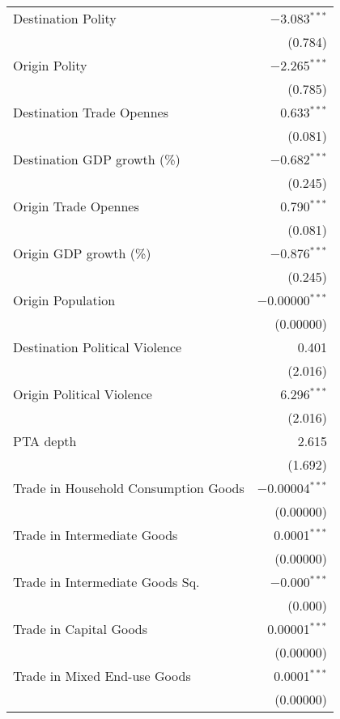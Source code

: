 \documentclass{article}
\begin{document}
\begin{longtable}{lr}
 Destination Polity & $-$3.083$^{***}$ \\ 
  & (0.784) \\ 

 Origin Polity & $-$2.265$^{***}$ \\ 
  & (0.785) \\ 

 Destination Trade Opennes & 0.633$^{***}$ \\ 
  & (0.081) \\ 

 Destination GDP growth (\%) & $-$0.682$^{***}$ \\ 
  & (0.245) \\ 

 Origin Trade Opennes & 0.790$^{***}$ \\ 
  & (0.081) \\ 

 Origin GDP growth (\%) & $-$0.876$^{***}$ \\ 
  & (0.245) \\ 

 Origin Population & $-$0.00000$^{***}$ \\ 
  & (0.00000) \\ 

 Destination Political Violence & 0.401 \\ 
  & (2.016) \\ 
 
Origin Political Violence & 6.296$^{***}$ \\ 
  & (2.016) \\ 

PTA depth & 2.615 \\ 
  & (1.692) \\ 

Trade in Household Consumption Goods & $-$0.00004$^{***}$ \\ 
  & (0.00000) \\ 

Trade in Intermediate Goods & 0.0001$^{***}$ \\ 
  & (0.00000) \\ 

Trade in Intermediate Goods Sq. & $-$0.000$^{***}$ \\ 
  & (0.000) \\ 

Trade in Capital Goods & 0.00001$^{***}$ \\ 
  & (0.00000) \\ 

Trade in Mixed End-use Goods & 0.0001$^{***}$ \\ 
  & (0.00000) \\ 


\end{longtable}
\end{document}
